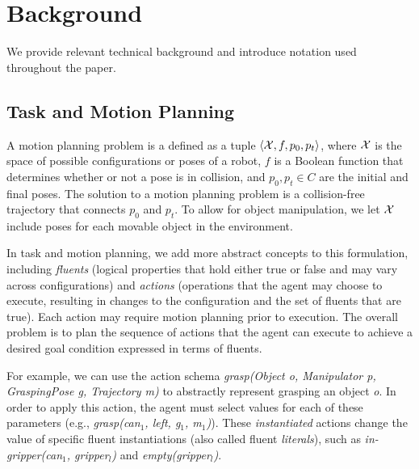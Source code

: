 \section{Background}
We provide relevant technical background and introduce notation
used throughout the paper. 

\subsection{Task and Motion Planning}

A motion planning problem is a defined as a tuple $\langle \mathcal{X}, f, p_0,
  p_t \rangle$, where $\mathcal{X}$ is the space of possible configurations or poses
of a robot, $f$ is a Boolean function that determines whether or not a
pose is in collision, and $p_0, p_t\in C$ are the initial and final
poses. The solution to a motion planning problem is a collision-free trajectory that
connects $p_0$ and $p_t$. To allow for object
manipulation, we let $\mathcal{X}$ include poses for each movable object in the
environment. 

In task and motion planning, we add more abstract concepts to this
formulation, including \emph{fluents} (logical properties that hold either
true or false and may
vary across configurations) and \emph{actions} (operations that the
agent may choose to execute, resulting in changes to the configuration
and the set of fluents that are true). Each action may require motion
planning prior to execution.  The overall problem is to plan the
sequence of actions that the agent can execute to achieve a
desired goal condition expressed in terms of fluents.

For example, we can use the action schema \emph{grasp(Object o,
  Manipulator p, GraspingPose g, Trajectory m)} to abstractly
represent grasping an object \emph{o}.  In order to apply this action,
the agent must select values for each of these parameters (e.g.,
\emph{grasp(can$_1$, left, g$_1$, m$_1$)}). These \emph{instantiated}
actions change the value of specific fluent instantiations (also
called fluent \emph{literals}), such as \emph{in-gripper(can$_1$, gripper$_l$)}
and \emph{empty(gripper$_l$)}.

